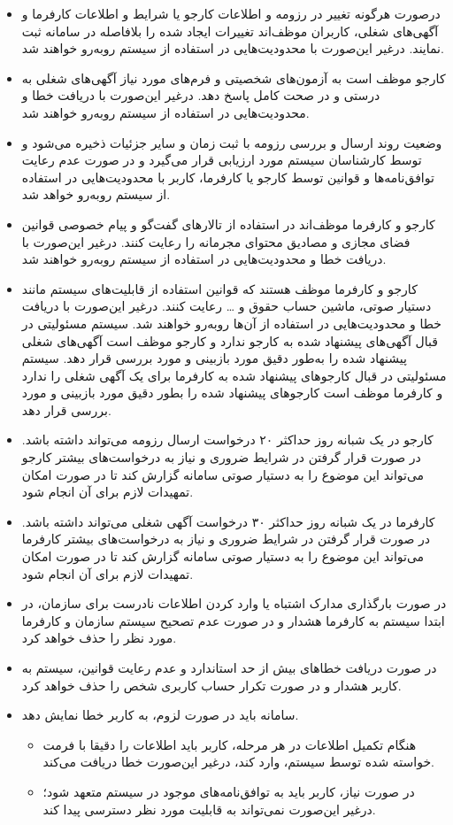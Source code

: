 \documentclass[12pt]{article}
\begin{document}
\begin{itemize}
		\item
		در‌صورت هرگونه تغییر در رزومه و اطلاعات کارجو یا شرایط و اطلاعات کارفرما و آگهی‌های شغلی، کاربران موظف‌اند تغییرات ایجاد شده را بلافاصله در سامانه ثبت نمایند. درغیر این‌صورت با محدودیت‌هایی در استفاده از سیستم روبه‌رو خواهند شد.
		\item
		کارجو موظف است به آزمون‌های شخصیتی و فرم‌های مورد نیاز آگهی‌های شغلی به درستی و در صحت کامل پاسخ دهد. درغیر این‌صورت با دریافت خطا و محدودیت‌هایی در استفاده از سیستم روبه‌رو خواهند شد.
		\item
		وضعیت روند ارسال و بررسی رزومه با ثبت زمان و سایر جزئیات ذخیره می‌شود و توسط کارشناسان سیستم مورد ارزیابی قرار می‌گیرد و در صورت عدم رعایت توافق‌نامه‌ها و قوانین توسط کارجو یا کارفرما، کاربر با محدودیت‌هایی در استفاده از سیستم روبه‌رو خواهد شد.
		\item
		کارجو و کارفرما موظف‌اند در استفاده از تالارهای گفت‌گو و پیام خصوصی قوانین فضای مجازی و مصادیق محتوای مجرمانه را رعایت کنند. درغیر این‌صورت با دریافت خطا و محدودیت‌هایی در استفاده از سیستم روبه‌‌رو خواهند شد.
		\item
		کارجو و کارفرما موظف هستند که قوانین استفاده از قابلیت‌های سیستم مانند دستیار صوتی، ماشین حساب حقوق و … رعایت کنند. درغیر این‌صورت با دریافت خطا و محدودیت‌هایی در استفاده از آن‌ها روبه‌رو خواهند شد.
		سیستم مسئولیتی در قبال آگهی‌های پیشنهاد شده به کارجو ندارد و کارجو موظف است آگهی‌های شغلی پیشنهاد شده را به‌طور دقیق مورد بازبینی و مورد بررسی قرار دهد.
		سیستم مسئولیتی در قبال کارجو‌های پیشنهاد شده به کارفرما برای یک آگهی شغلی را ندارد و کارفرما موظف است کارجو‌های پیشنهاد شده را بطور دقیق مورد بازبینی و مورد بررسی قرار دهد.
		\item
		کارجو در یک شبانه روز حداکثر ۲۰ درخواست ارسال رزومه می‌تواند داشته باشد. در‌ صورت قرار گرفتن در شرایط ضروری و نیاز به درخواست‌های بیشتر کارجو می‌تواند این موضوع را به دستیار صوتی سامانه گزارش کند تا در صورت امکان تمهیدات لازم برای آن انجام شود.
		\item
		کارفرما در یک شبانه روز حداکثر ۳۰ درخواست آگهی شغلی می‌تواند داشته باشد. در‌ صورت قرار گرفتن در شرایط ضروری و نیاز به درخواست‌های بیشتر کارفرما می‌تواند این موضوع را به دستیار صوتی سامانه گزارش کند تا در صورت امکان تمهیدات لازم برای آن انجام شود.
		\item
		در‌ صورت بارگذاری مدارک اشتباه یا وارد کردن اطلاعات نادرست برای سازمان، در ابتدا سیستم به کارفرما هشدار و در صورت عدم تصحیح سیستم سازمان و کارفرما مورد‌ نظر را حذف خواهد کرد.
		\item
		در صورت دریافت خطاهای بیش از حد استاندارد و عدم رعایت قوانین، سیستم به کاربر هشدار و در‌ صورت تکرار حساب کاربری شخص را حذف خواهد کرد.
		\item
		سامانه باید در صورت لزوم، به کاربر خطا نمایش دهد.
		\begin{itemize}
			\item
			هنگام تکمیل اطلاعات در هر مرحله، کاربر باید اطلاعات را دقیقا با فرمت خواسته شده توسط سیستم، وارد کند، درغیر این‌صورت خطا دریافت می‌کند.
			\item
			در صورت نیاز، کاربر باید به توافق‌نامه‌های موجود در سیستم متعهد شود؛ درغیر این‌صورت نمی‌تواند به قابلیت مورد نظر دسترسی پیدا کند.
		\end{itemize}
	\end{itemize}
\end{document}

